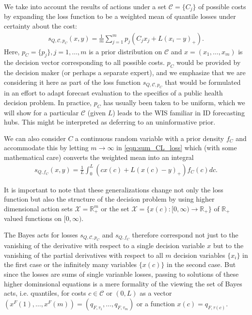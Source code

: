 \documentclass{article}
\begin{document}
We take into account the results of actions under a set $\mathcal{C} = \{C_j\}$ of possible costs by expanding the loss function to be a weighted mean of quantile losses under certainty about the cost:
\begin{align}
s_{Q,\mathcal{C}, p_C}(x,y) = \frac{1}{m}\sum_{j=1}^{m}p_j(C_j x_j + L(x_i - y)_+). \label{eqn:sum_CL_loss}
\end{align}
Here, $p_C = \{p_j\}, j = 1,\ldots,m$ is a prior distribution on $\mathcal{C}$ and $x = (x_1,\ldots,x_m)$ is the decision vector corresponding to all possible costs.  $p_C$ would be provided by the decision maker (or perhaps a separate expert), and we emphasize that we are considering it here as part of the loss function $s_{Q,\mathcal{C}, p_C}$ that would be formulated in an effort to adapt forecast evaluation to the specifics of a public health decision problem. In practice, $p_C$ has usually been taken to be uniform, which we will show for a particular $\mathcal{C}$ (given $L$) leads to the WIS familiar in ID forecasting hubs. This might be interpreted as deferring to an uninformative prior. 

We can also consider $C$ a continuous random variable with a prior density $f_C$ and accommodate this by letting $m \to \infty$ in \eqref{eqn:sum_CL_loss} 
which (with some mathematical care) converts the weighted mean into an integral
\begin{align}
s_{Q,f_C}(x,y) = \frac{1}{L}\int_{0}^{L} (cx(c) + L(x(c) - y)_+) f_C(c)dc{}.
\end{align}

It is important to note that these generalizations change not only the loss function but also the structure of the decision problem by using higher dimensional action sets $\mathcal{X}= \mathbb{R}_+^m$ or the set $\mathcal{X} = \{x(c):[0,\infty) \to \mathbb{R}_+\}$ of $\mathbb{R}_+$ valued functions on $[0,\infty)$.

The Bayes acts for losses $s_{Q,\mathcal{C}, p_C}$ and $s_{Q,f_C}$ therefore correspond not just to the vanishing of the derivative with respect to a single
decision variable $x$ but to the vanishing of the partial derivatives with respect to all $m$ decision variables $\{x_i\}$ in the first case or the infinitely many variables $\{x(c)\}$ in the second case.  But since the losses are sums of single varianble losses, passing to solutions of these higher dominsional equations is a mere formality of the viewing the set of Bayes acts, i.e. quantiles, for costs $c \in \mathcal{C}$ or $(0,L)$ as a vector 
$(x^F(1),\ldots,x^F(m))=(q_{F,\tau_1},\ldots,q_{F,\tau_m})$ or a function $x(c) = q_{F,\tau(c)}$.
\end{document}
